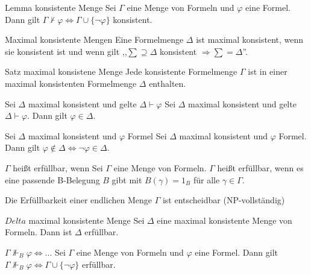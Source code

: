 \documentclass[avery5371]{flashcards}
\begin{document}
\begin{flashcard}[ Vollständigkeit ]{ Lemma konsistente Menge }
    Sei $\Gamma$ eine Menge von Formeln und $\varphi$ eine Formel. Dann gilt $\Gamma\not\vdash\varphi \Leftrightarrow \Gamma\cup\{\lnot\varphi\}$ konsistent.
\end{flashcard}

\begin{flashcard}[ Vollständigkeit ]{ Maximal konsistente Mengen }
    Eine Formelmenge $\Delta$ ist maximal konsistent, wenn sie konsistent ist und wenn gilt ,,$\sum\supseteq\Delta$ konsistent $\Rightarrow\sum = \Delta$''.
\end{flashcard}

\begin{flashcard}[ Vollständigkeit ]{ Satz maximal konsistene Menge }
    Jede konsistente Formelmenge $\Gamma$ ist in einer maximal konsistenten Formelmenge $\Delta$ enthalten.
\end{flashcard}

\begin{flashcard}[ Vollständigkeit ]{ Sei $\Delta$ maximal konsistent und gelte $\Delta\vdash\varphi$ }
    Sei $\Delta$ maximal konsistent und gelte $\Delta\vdash\varphi$. Dann gilt $\varphi\in\Delta$.
\end{flashcard}

\begin{flashcard}[ Vollständigkeit ]{ Sei $\Delta$ maximal konsistent und $\varphi$ Formel }
    Sei $\Delta$ maximal konsistent und $\varphi$ Formel. Dann gilt $\varphi\not\in\Delta\Leftrightarrow\lnot\varphi\in\Delta$.
\end{flashcard}

\begin{flashcard}{ $\Gamma$ heißt erfüllbar, wenn }
    Sei $\Gamma$ eine Menge von Formeln. $\Gamma$ heißt erfüllbar, wenn es eine passende B-Belegung $B$ gibt mit $B(\gamma) = 1_B$ für alle $\gamma\in\Gamma$.

    Die Erfüllbarkeit einer endlichen Menge $\Gamma$ ist entscheidbar (NP-vollständig)
\end{flashcard}

\begin{flashcard}{ $Delta$ maximal konsistente Menge }
    Sei $\Delta$ eine maximal konsistente Menge von Formeln. Dann ist $\Delta$ erfüllbar.
\end{flashcard}

\begin{flashcard}{ $\Gamma\not\Vdash_B\varphi\Leftrightarrow...$ }
    Sei $\Gamma$ eine Menge von Formeln und $\varphi$ eine Formel. Dann gilt $\Gamma\not\Vdash_B\varphi\Leftrightarrow\Gamma\cup\{\lnot \varphi\}$ erfüllbar.
\end{flashcard}
\end{document}
